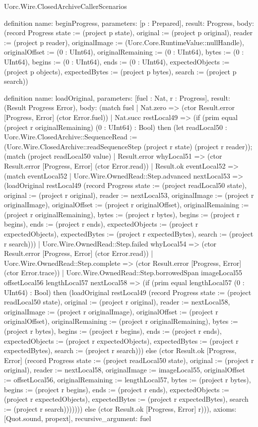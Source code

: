 \begin{lexlean}{Uorc.Wire.ClosedArchiveCallerScenarios}
\begin{semanticmodule}
definition{
  name: beginProgress,
  parameters: [p : Prepared],
  result: Progress,
  body: (record Progress {state := (project p state), original := (project p original), reader := (project p reader), originalImage := (Uorc.Core.RuntimeValue::nullHandle), originalOffset := (0 : UInt64), originalRemaining := (0 : UInt64), bytes := (0 : UInt64), begins := (0 : UInt64), ends := (0 : UInt64), expectedObjects := (project p objects), expectedBytes := (project p bytes), search := (project p search)})
}

definition{
  name: loadOriginal,
  parameters: [fuel : Nat, r : Progress],
  result: (Result Progress Error),
  body: (match fuel
    | Nat.zero => (ctor Result.error [Progress, Error] (ctor Error.fuel))
    | Nat.succ restLocal49 => (if (prim equal (project r originalRemaining) (0 : UInt64) : Bool) then (let readLocal50 : Uorc.Wire.ClosedArchive::SequenceRead := (Uorc.Wire.ClosedArchive::readSequenceStep (project r state) (project r reader)); (match (project readLocal50 value)
      | Result.error whyLocal51 => (ctor Result.error [Progress, Error] (ctor Error.read))
      | Result.ok eventLocal52 => (match eventLocal52
        | Uorc.Wire.OwnedRead::Step.advanced nextLocal53 => (loadOriginal restLocal49 (record Progress {state := (project readLocal50 state), original := (project r original), reader := nextLocal53, originalImage := (project r originalImage), originalOffset := (project r originalOffset), originalRemaining := (project r originalRemaining), bytes := (project r bytes), begins := (project r begins), ends := (project r ends), expectedObjects := (project r expectedObjects), expectedBytes := (project r expectedBytes), search := (project r search)}))
        | Uorc.Wire.OwnedRead::Step.failed whyLocal54 => (ctor Result.error [Progress, Error] (ctor Error.read))
        | Uorc.Wire.OwnedRead::Step.complete => (ctor Result.error [Progress, Error] (ctor Error.trace))
        | Uorc.Wire.OwnedRead::Step.borrowedSpan imageLocal55 offsetLocal56 lengthLocal57 nextLocal58 => (if (prim equal lengthLocal57 (0 : UInt64) : Bool) then (loadOriginal restLocal49 (record Progress {state := (project readLocal50 state), original := (project r original), reader := nextLocal58, originalImage := (project r originalImage), originalOffset := (project r originalOffset), originalRemaining := (project r originalRemaining), bytes := (project r bytes), begins := (project r begins), ends := (project r ends), expectedObjects := (project r expectedObjects), expectedBytes := (project r expectedBytes), search := (project r search)})) else (ctor Result.ok [Progress, Error] (record Progress {state := (project readLocal50 state), original := (project r original), reader := nextLocal58, originalImage := imageLocal55, originalOffset := offsetLocal56, originalRemaining := lengthLocal57, bytes := (project r bytes), begins := (project r begins), ends := (project r ends), expectedObjects := (project r expectedObjects), expectedBytes := (project r expectedBytes), search := (project r search)})))))) else (ctor Result.ok [Progress, Error] r))),
  axioms: [Quot.sound, propext],
  recursive_argument: fuel
}


\end{semanticmodule}
\end{lexlean}
